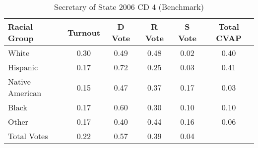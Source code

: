 \begin{table}[htb]
\begin{center}
\caption{Secretary of State 2006 CD 4 (Benchmark)}
\label{sos06_cvap_cd_4_benchmark}
\begin{tabular}{lccccc}
  \hline
Racial Group & Turnout & D Vote & R Vote & S Vote & Total CVAP \\ 
  \hline
White & 0.30 & 0.49 & 0.48 & 0.02 & 0.40 \\ 
  Hispanic & 0.17 & 0.72 & 0.25 & 0.03 & 0.41 \\ 
  Native American & 0.15 & 0.47 & 0.37 & 0.17 & 0.03 \\ 
  Black & 0.17 & 0.60 & 0.30 & 0.10 & 0.10 \\ 
  Other & 0.17 & 0.40 & 0.44 & 0.16 & 0.06 \\ 
  Total Votes & 0.22 & 0.57 & 0.39 & 0.04 &  \\ 
   \hline
\end{tabular}
\end{center}
\end{table}
